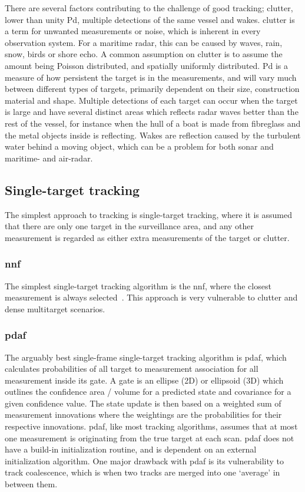 There are several factors contributing to the challenge of good tracking; \gls{clutter}, lower than unity \gls{Pd}, multiple detections of the same vessel and wakes. \Gls{clutter} is a term for unwanted measurements or noise, which is inherent in every observation system. For a maritime radar, this can be caused by waves, rain, snow, birds or shore echo. A common assumption on clutter is to assume the amount being Poisson distributed, and spatially uniformly distributed. \gls{Pd} is a measure of how persistent the target is in the measurements, and will vary much between different types of targets, primarily dependent on their size, construction material and shape. Multiple detections of each target can occur when the target is large and have several distinct areas which reflects radar waves better than the rest of the vessel, for instance when the hull of a boat is made from fibreglass and the metal objects inside is reflecting. Wakes are reflection caused by the turbulent water behind a moving object, which can be a problem for both sonar and maritime- and air-radar.

\subsection{Single-target tracking}
The simplest approach to tracking is single-target tracking, where it is assumed that there are only one target in the surveillance area, and any other measurement is regarded as either extra measurements of the target or \gls{clutter}. 

\subsubsection*{\gls{nnf}}
The simplest single-target tracking algorithm is the \gls{nnf}, where the closest measurement is always selected~\cite{Bar-Shalom1998}. This approach is very vulnerable to clutter and dense multitarget scenarios.%

\subsubsection*{\gls{pdaf}}
The arguably best single-frame single-target tracking algorithm is \gls{pdaf}, which calculates probabilities of all target to measurement association for all measurement inside its gate. A gate is an ellipse (2D) or ellipsoid (3D) which outlines the confidence area / volume for a predicted state and covariance for a given confidence value. The state update is then based on a weighted sum of measurement innovations where the weightings are the probabilities for their respective innovations. \gls{pdaf}, like most tracking algorithms, assumes that at most one measurement is originating from the true target at each scan. \gls{pdaf} does not have a build-in initialization routine, and is dependent on an external initialization algorithm. One major drawback with \gls{pdaf} is its vulnerability to track \gls{coalescence}, which is when two tracks are merged into one `average' in between them. 

